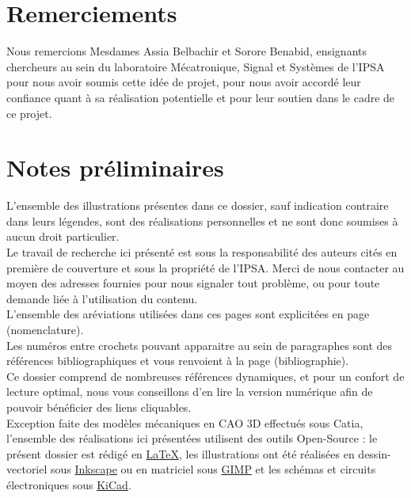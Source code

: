\documentclass[11pt]{article}
\begin{document}


\setcounter{secnumdepth}{5}
\setcounter{tocdepth}{5}

\newpage
\tableofcontents
\newpage
{}

\section*{Remerciements}

	Nous remercions Mesdames Assia Belbachir et Sorore Benabid, ensignants chercheurs au sein du laboratoire Mécatronique, Signal et Systèmes de l'IPSA pour nous avoir soumis cette idée de projet, pour nous avoir accordé leur confiance quant à sa réalisation potentielle et pour leur soutien dans le cadre de ce projet.

	\vspace{80pt}

\section*{Notes préliminaires}
	L'ensemble des illustrations présentes dans ce dossier, sauf indication contraire dans leurs légendes, sont des réalisations personnelles et ne sont donc soumises à aucun droit particulier.\\

	Le travail de recherche ici présenté est sous la responsabilité des auteurs cités en première de couverture et sous la propriété de l'IPSA. Merci de nous contacter au moyen des adresses fournies pour nous signaler tout problème, ou pour toute demande liée à l'utilisation du contenu.\\

	L'ensemble des aréviations utilisées dans ces pages sont explicitées en page \pageref{nomenclature} (nomenclature).\\

	Les numéros entre crochets pouvant apparaitre au sein de paragraphes sont des références bibliographiques et vous renvoient à la page \pageref{bibliographie} (bibliographie).\\

	Ce dossier comprend de nombreuses références dynamiques, et pour un confort de lecture optimal, nous vous conseillons d'en lire la version numérique afin de pouvoir bénéficier des liens cliquables.\\

	Exception faite des modèles mécaniques en CAO 3D effectués sous Catia\textsuperscript{\textregistered}, l'ensemble des réalisations ici présentées utilisent des outils Open-Source : le présent dossier est rédigé en \href{https://www.latex-project.org/}{\LaTeX}, les illustrations ont été réalisées en dessin-vectoriel sous \href{https://inkscape.org/fr/}{Inkscape} ou en matriciel sous \href{https://www.gimp.org/}{GIMP} et les schémas et circuits électroniques sous \href{http://kicad-pcb.org/}{KiCad}.
\end{document}
